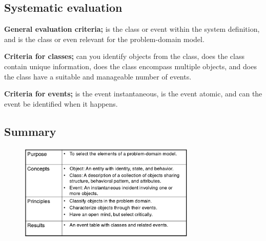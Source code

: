 \subsection{Systematic evaluation}%
\textbf{General evaluation criteria;} is the class or event within the system definition, and is the class or even relevant for the problem-domain model. 

\noindent \textbf{Criteria for classes;} can you identify objects from the class, does the class contain unique information, does the class encompass multiple objects, and does the class have a suitable and manageable number of events.

\noindent \textbf{Criteria for events;} is the event instantaneous, is the event atomic, and can the event be identified when it happens. 

\subsection{Summary}
\begin{figure}[H]
    \centering
    \includegraphics[width=0.75\textwidth]{figures/classessummary.png}
\end{figure}
